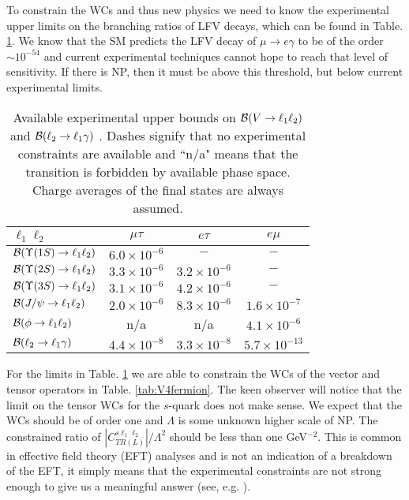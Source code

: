 \documentclass[12pt]{article}
\begin{document}
To constrain the WCs and thus new physics we need to know the experimental upper limits on the branching ratios of LFV decays, which can be found in Table. \ref{tab:Vdecaylimits}.  We know that the SM predicts the LFV decay of $\mu \to e \gamma$ to be of the order $\sim 10^{-54}$ \cite{Cheng:1985bj} and current experimental techniques cannot hope to reach that level of sensitivity.  If there is NP, then it must be above this threshold, but below current experimental limits.

\begin{table*}
\begin{center}
\footnotesize
\begin{tabular}{lccc}
\hline \hline
$\ell_1 \ell_2$ &$\mu \tau$ & $e \tau$ & $e \mu$  \\ 
\hline
${\cal B}(\Upsilon (1S) \to \ell_1 \ell_2)$ & $ 6.0 \times 10^{-6}$ & $-$ & $-$  \\
%
${\cal B}(\Upsilon (2S) \to \ell_1 \ell_2)$ &  $3.3 \times 10^{-6}$ & $3.2 \times 10^{-6}$ & $-$ \\ 
%
${\cal B}(\Upsilon (3S) \to \ell_1 \ell_2)$ &  $3.1 \times 10^{-6}$ & $4.2 \times 10^{-6}$ & $-$ \\
%
${\cal B}(J/\psi \to \ell_1 \ell_2)$ &  $2.0 \times 10^{-6}$ & $8.3 \times 10^{-6}$ & $1.6 \times 10^{-7}$ \\
%
${\cal B}(\phi \to \ell_1 \ell_2)$ &  n/a & n/a & $4.1 \times 10^{-6}$ \\ 
%
${\cal B}(\ell_2 \to \ell_1 \gamma)$ & $4.4 \times 10^{-8}$ & $3.3 \times 10^{-8}$ & $5.7 \times 10^{-13}$ \\
%
\hline \hline
\end{tabular}
\end{center}
\caption{\label{tab:Vdecaylimits} Available experimental upper bounds on 
${\cal B}(V \to \ell_1 \ell_2)$ and ${\cal B}( \ell_2 \to \ell_1 \gamma)$ \cite{PDG,Lees:2010jk}. 
Dashes signify that no experimental constraints are available and ``n/a" means 
that the transition is forbidden by available phase space. Charge averages of the final states are always assumed.}
\end{table*}

For the limits in Table. \ref{tab:Vdecaylimits} we are able to constrain the WCs of the vector and 
tensor operators in Table. \ref{tab:V4fermion}.  The keen observer will notice that the limit on the 
tensor WCs for the $s$-quark does not make sense.  We expect that the WCs should 
be of order one and $\Lambda$ is some unknown higher scale of NP.  The constrained ratio of 
$|C_{TR(L)}^{s \ell_1 \ell_2}|/\Lambda^2$ should be less than one GeV$^{-2}$.  This is common in effective field theory (EFT) analyses 
and is not an indication of a breakdown of the EFT, it simply means that the experimental constraints are 
not strong enough to give us a meaningful answer (see, e.g. \cite{Petrov:2013nia}).
\end{document}
